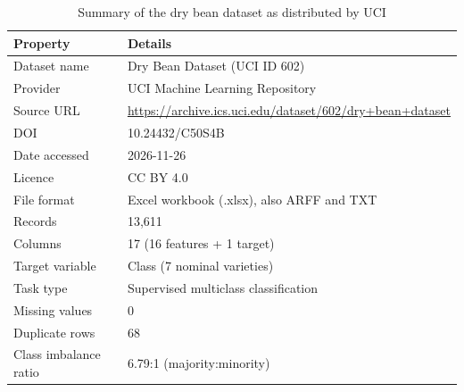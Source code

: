 \begin{table}[htbp]
\centering
\small
\caption{Summary of the dry bean dataset as distributed by UCI}
\label{tab:dataset_summary}
\begin{tabular}{p{}p{}}
\toprule
Property & Details \\
\midrule
Dataset name & Dry Bean Dataset (UCI ID 602) \\
Provider & UCI Machine Learning Repository \\
Source URL & \url{https://archive.ics.uci.edu/dataset/602/dry+bean+dataset} \\
DOI & 10.24432/C50S4B \\
Date accessed & 2026-11-26 \\
Licence & CC BY 4.0 \\
File format & Excel workbook (.xlsx), also ARFF and TXT \\
Records & 13,611 \\
Columns & 17 (16 features + 1 target) \\
Target variable & Class (7 nominal varieties) \\
Task type & Supervised multiclass classification \\
Missing values & 0 \\
Duplicate rows & 68 \\
Class imbalance ratio & 6.79:1 (majority:minority) \\
\bottomrule
\end{tabular}
\end{table}
